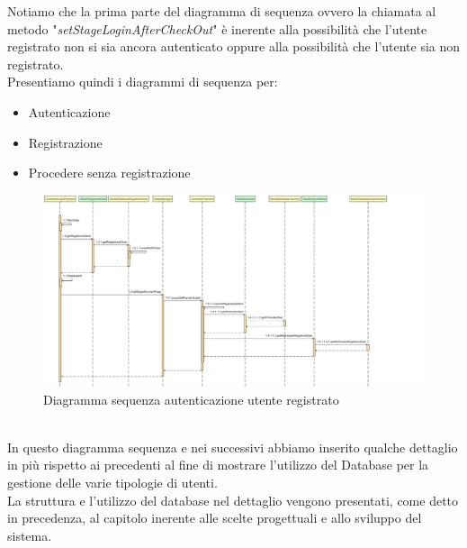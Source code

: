 \documentclass[a4paper,11pt]{report}
\begin{document}
Notiamo che la prima parte del diagramma di sequenza ovvero la chiamata al metodo "\textit{setStageLoginAfterCheckOut}" è inerente alla possibilità che l'utente registrato non si sia ancora autenticato oppure alla possibilità che l'utente sia non registrato.\\
\clearpage
Presentiamo quindi i diagrammi di sequenza per:
\begin{itemize}
    \item Autenticazione
    \item Registrazione
    \item Procedere senza registrazione
\end{itemize}
\leavevmode \newline
\begin{figure}[h!]
    	\centering
    	\hspace*{-0.4in}
    	\includegraphics[width=1.1\linewidth]{Sequence diagrams/1 Registered user/regUser.png}
    	\caption{Diagramma sequenza autenticazione utente registrato}
    \end{figure} \leavevmode \\
    
In questo diagramma sequenza e nei successivi abbiamo inserito qualche dettaglio in più rispetto ai precedenti al fine di mostrare l'utilizzo del Database per la gestione delle varie tipologie di utenti.\\

\leavevmode \newline
La struttura e l'utilizzo del database nel dettaglio vengono presentati, come detto in precedenza, al capitolo inerente alle scelte progettuali e allo sviluppo del sistema.
\end{document}

